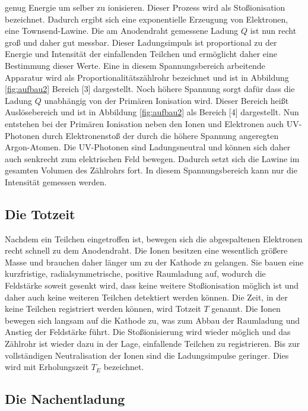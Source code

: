     genug Energie um selber zu ionisieren. Dieser Prozess wird als Stoßionisation bezeichnet. Dadurch
    ergibt sich eine exponentielle Erzeugung von Elektronen, eine Townsend-Lawine. Die am Anodendraht
    gemessene Ladung $Q$ ist nun recht groß und daher gut messbar. Dieser Ladungsimpuls ist
    proportional zu der Energie und Intensität der einfallenden Teilchen und ermöglicht daher eine
    Bestimmung dieser Werte. Eine in diesem Spannungsbereich arbeitende Apparatur wird als
    Proportionalitätszählrohr bezeichnet und ist in Abbildung \ref{fig:aufbau2} Bereich [3]
    dargestellt.
    Noch höhere Spannung sorgt dafür dass die Ladung $Q$ unabhängig von der Primären Ionisation wird.
    Dieser Bereich heißt Auslösebereich und ist in Abbildung \ref{fig:aufbau2} als Bereich [4]
    dargestellt. Nun entstehen bei der Primären Ionisation neben den Ionen und Elektronen auch
    UV-Photonen durch Elektronenstoß der durch die höhere Spannung angeregten Argon-Atomen. Die
    UV-Photonen sind Ladungsneutral und können sich daher auch senkrecht zum elektrischen Feld bewegen.
    Dadurch setzt sich die Lawine im gesamten Volumen des Zählrohrs fort. In diesem Spannungsbereich
    kann nur die Intensität gemessen werden.
  \subsection{Die Totzeit}
    Nachdem ein Teilchen eingetroffen ist, bewegen sich die abgespaltenen Elektronen recht schnell zu
    dem Anodendraht. Die Ionen besitzen eine wesentlich größere Masse und brauchen daher länger um zu
    der Kathode zu gelangen. Sie bauen eine kurzfristige, radialsymmetrische, positive Raumladung auf,
    wodurch die Feldstärke soweit gesenkt wird, dass keine weitere Stoßionisation möglich ist und
    daher auch keine weiteren Teilchen detektiert werden können. Die Zeit, in der keine Teilchen
    registriert werden können, wird Totzeit $T$ genannt. Die Ionen bewegen sich langsam auf die
    Kathode zu, was zum Abbau der Raumladung und Anstieg der Feldstärke führt. Die Stoßionisierung
    wird wieder möglich und das Zählrohr ist wieder dazu in der Lage, einfallende Teilchen zu
    registrieren. Bis zur vollständigen Neutralisation der Ionen sind die Ladungsimpulse geringer.
    Dies wird mit Erholungszeit $T_{E}$ bezeichnet.
  \subsection{Die Nachentladung}
    
\label{sec:Theorie}
